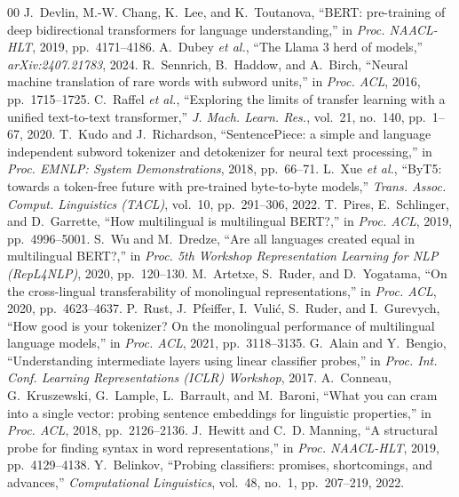 \documentclass[preprint,12pt]{elsarticle}
\begin{document}
\begin{thebibliography}{00}
 J.~Devlin, M.-W. Chang, K.~Lee, and K.~Toutanova, ``BERT: pre-training of deep bidirectional transformers for language understanding,'' in \emph{Proc. NAACL-HLT}, 2019, pp.~4171--4186.
 A.~Dubey \emph{et al.}, ``The Llama 3 herd of models,'' \emph{arXiv:2407.21783}, 2024.
 R.~Sennrich, B.~Haddow, and A.~Birch, ``Neural machine translation of rare words with subword units,'' in \emph{Proc. ACL}, 2016, pp.~1715--1725.
 C.~Raffel \emph{et al.}, ``Exploring the limits of transfer learning with a unified text-to-text transformer,'' \emph{J. Mach. Learn. Res.}, vol.~21, no.~140, pp.~1--67, 2020.
 T.~Kudo and J.~Richardson, ``SentencePiece: a simple and language independent subword tokenizer and detokenizer for neural text processing,'' in \emph{Proc. EMNLP: System Demonstrations}, 2018, pp.~66--71.
 L.~Xue \emph{et al.}, ``ByT5: towards a token-free future with pre-trained byte-to-byte models,'' \emph{Trans. Assoc. Comput. Linguistics (TACL)}, vol.~10, pp.~291--306, 2022.
 T.~Pires, E.~Schlinger, and D.~Garrette, ``How multilingual is multilingual BERT?,'' in \emph{Proc. ACL}, 2019, pp.~4996--5001.
 S.~Wu and M.~Dredze, ``Are all languages created equal in multilingual BERT?,'' in \emph{Proc. 5th Workshop Representation Learning for NLP (RepL4NLP)}, 2020, pp.~120--130.
 M.~Artetxe, S.~Ruder, and D.~Yogatama, ``On the cross-lingual transferability of monolingual representations,'' in \emph{Proc. ACL}, 2020, pp.~4623--4637.
 P.~Rust, J.~Pfeiffer, I.~Vuli\'c, S.~Ruder, and I.~Gurevych, ``How good is your tokenizer? On the monolingual performance of multilingual language models,'' in \emph{Proc. ACL}, 2021, pp.~3118--3135.
 G.~Alain and Y.~Bengio, ``Understanding intermediate layers using linear classifier probes,'' in \emph{Proc. Int. Conf. Learning Representations (ICLR) Workshop}, 2017.
 A.~Conneau, G.~Kruszewski, G.~Lample, L.~Barrault, and M.~Baroni, ``What you can cram into a single vector: probing sentence embeddings for linguistic properties,'' in \emph{Proc. ACL}, 2018, pp.~2126--2136.
 J.~Hewitt and C.~D. Manning, ``A structural probe for finding syntax in word representations,'' in \emph{Proc. NAACL-HLT}, 2019, pp.~4129--4138.
 Y.~Belinkov, ``Probing classifiers: promises, shortcomings, and advances,'' \emph{Computational Linguistics}, vol.~48, no.~1, pp.~207--219, 2022.

\end{thebibliography}
\end{document}
